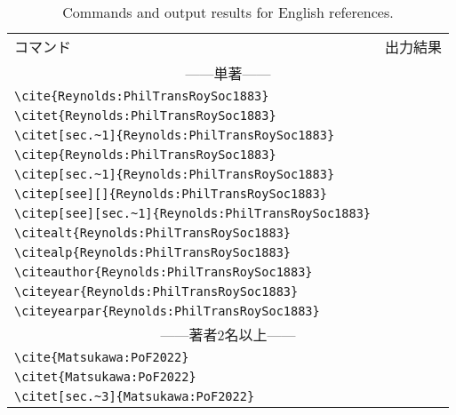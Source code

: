 \begin{table}[t]
    \centering
    \caption{Commands and output results for English references.}
    \label{tab:English}
    \begin{tabular}{ll}
        コマンド &出力結果 \\
        \multicolumn{2}{c}{------単著------} \\
        \verb|\cite{Reynolds:PhilTransRoySoc1883}|          &\cite{Reynolds:PhilTransRoySoc1883} \\
        \verb|\citet{Reynolds:PhilTransRoySoc1883}|         &\citet{Reynolds:PhilTransRoySoc1883} \\
        \verb|\citet[sec.~1]{Reynolds:PhilTransRoySoc1883}|         &\citet[sec.~1]{Reynolds:PhilTransRoySoc1883} \\
        \verb|\citep{Reynolds:PhilTransRoySoc1883}|         &\citep{Reynolds:PhilTransRoySoc1883} \\
        \verb|\citep[sec.~1]{Reynolds:PhilTransRoySoc1883}|         &\citep[sec.~1]{Reynolds:PhilTransRoySoc1883} \\
        \verb|\citep[see][]{Reynolds:PhilTransRoySoc1883}|         &\citep[see][]{Reynolds:PhilTransRoySoc1883} \\
        \verb|\citep[see][sec.~1]{Reynolds:PhilTransRoySoc1883}|         &\citep[see][sec.~1]{Reynolds:PhilTransRoySoc1883} \\
        \verb|\citealt{Reynolds:PhilTransRoySoc1883}|       &\citealt{Reynolds:PhilTransRoySoc1883} \\
        \verb|\citealp{Reynolds:PhilTransRoySoc1883}|       &\citealp{Reynolds:PhilTransRoySoc1883} \\
        \verb|\citeauthor{Reynolds:PhilTransRoySoc1883}|    &\citeauthor{Reynolds:PhilTransRoySoc1883} \\
        \verb|\citeyear{Reynolds:PhilTransRoySoc1883}|      &\citeyear{Reynolds:PhilTransRoySoc1883} \\
        \verb|\citeyearpar{Reynolds:PhilTransRoySoc1883}|   &\citeyearpar{Reynolds:PhilTransRoySoc1883} \\
        \multicolumn{2}{c}{------著者2名以上------} \\
        \verb|\cite{Matsukawa:PoF2022}|         &\cite{Matsukawa:PoF2022} \\
        \verb|\citet{Matsukawa:PoF2022}|        &\citet{Matsukawa:PoF2022} \\
        \verb|\citet[sec.~3]{Matsukawa:PoF2022}|        &\citet[sec.~3]{Matsukawa:PoF2022} \\

\end{tabular}
\end{table}
